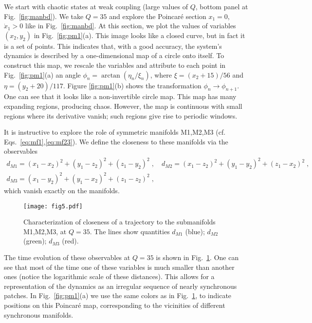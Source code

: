 \documentclass[3p,number,review,sort&compress]{elsarticle}
\begin{document}
We start with chaotic states at weak coupling (large values of $Q$, bottom panel at Fig.~\ref{fig:manbd}). We take $Q=35$ and explore the Poincar\'e section $x_1=0$, 
$\dot x_1>0$ like in Fig.~\ref{fig:manbd}. At this section, we plot the values of variables 
$(x_2,y_2)$ in Fig.~\ref{fig:pm1}(a). This image looks like a closed curve, but in fact it is a set of points. This indicates that, with a good accuracy,
the system's dynamics is described by a one-dimensional map of a circle onto itself.
To construct this map, we rescale the variables and attribute to each
point in Fig.~\ref{fig:pm1}(a) an angle $\phi_n=\arctan(\eta_n/\xi_n)$,
where $\xi=(x_2+15)/56$ and $\eta=(y_2+20)/117$. Figure \ref{fig:pm1}(b)
shows the transformation $\phi_n\to \phi_{n+1}$. One can see that
it looks like a non-invertible circle map. This map has many
expanding regions, producing chaos. However, the map is continuous with
small regions where its derivative vanish; such regions give rise to periodic windows.

It is instructive to explore the role of symmetric manifolds M1,M2,M3 (cf. Eqs.~\eqref{eq:mf1},\eqref{eq:mf23}). We define the closeness to these manifolds
via the observables
\begin{equation}
\begin{gathered}
d_{M1}=(x_1-x_2)^2+(y_1-z_2)^2+(z_1-y_2)^2\;,\quad d_{M2}=(x_1-z_2)^2+(y_1-y_2)^2+(z_1-x_2)^2\;,
\\ d_{M3}=(x_1-y_2)^2+(y_1-x_2)^2+(z_1-z_2)^2\;,
\end{gathered}
\end{equation}
which vanish exactly on the manifolds.

\begin{figure}[!htb]
\centering
\texttt{[image: fig5.pdf]}
\caption{Characterization of closeness of a trajectory to the submanifolds M1,M2,M3,
at $Q=35$. The lines show quantities $d_{M1}$ (blue); $d_{M2}$ (green); $d_{M3}$ (red).
}
\label{fig:tr-dm}
\end{figure}

The time evolution of these observables at $Q=35$ is shown in Fig.~\ref{fig:tr-dm}.
One can see that most of the time one of these variables is much smaller
than another ones (notice the logarithmic scale of these distances). This allows for a representation of the dynamics as an irregular sequence of nearly synchronous patches. In Fig.~\ref{fig:pm1}(a) we use the
same colors as in Fig.~\ref{fig:tr-dm}, to indicate positions on 
this Poincar\'e map, corresponding to the vicinities of different
synchronous manifolds.
\end{document}
